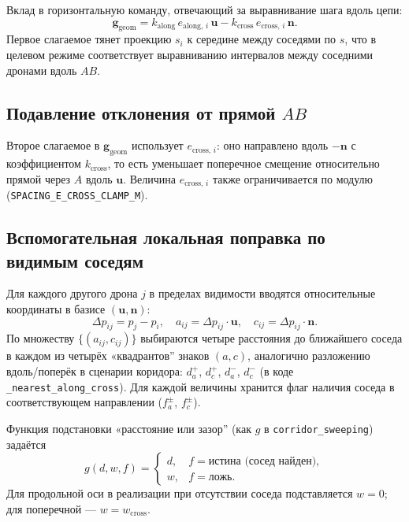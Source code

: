 \documentclass[12pt,a4paper]{article}
\begin{document}
Вклад в горизонтальную команду, отвечающий за выравнивание шага вдоль цепи:
\begin{equation}
  \mathbf{g}_{\mathrm{geom}} = k_{\mathrm{along}}\, e_{\mathrm{along},\,i}\, \mathbf{u} - k_{\mathrm{cross}}\, e_{\mathrm{cross},\,i}\, \mathbf{n}.
\end{equation}
Первое слагаемое тянет проекцию $s_i$ к середине между соседями по $s$, что в целевом режиме соответствует выравниванию интервалов между соседними дронами вдоль $AB$.

\subsection{Подавление отклонения от прямой $AB$}

Второе слагаемое в $\mathbf{g}_{\mathrm{geom}}$ использует $e_{\mathrm{cross},\,i}$: оно направлено вдоль $-\mathbf{n}$ с коэффициентом $k_{\mathrm{cross}}$, то есть уменьшает поперечное смещение относительно прямой через $A$ вдоль $\mathbf{u}$. Величина $e_{\mathrm{cross},\,i}$ также ограничивается по модулю (\texttt{SPACING\_E\_CROSS\_CLAMP\_M}).

\subsection{Вспомогательная локальная поправка по видимым соседям}

Для каждого другого дрона $j$ в пределах видимости вводятся относительные координаты в базисе $(\mathbf{u}, \mathbf{n})$:
\[
  \Delta p_{ij} = p_j - p_i, \quad
  a_{ij} = \Delta p_{ij} \cdot \mathbf{u}, \quad
  c_{ij} = \Delta p_{ij} \cdot \mathbf{n}.
\]
По множеству $\{(a_{ij}, c_{ij})\}$ выбираются четыре расстояния до ближайшего соседа в каждом из четырёх «квадрантов'' знаков $(a,c)$, аналогично разложению вдоль/поперёк в сценарии коридора: $d_a^+$, $d_c^+$, $d_a^-$, $d_c^-$ (в коде \texttt{\_nearest\_along\_cross}). Для каждой величины хранится флаг наличия соседа в соответствующем направлении ($f_a^\pm$, $f_c^\pm$).

Функция подстановки «расстояние или зазор'' (как $g$ в \texttt{corridor\_sweeping}) задаётся
\begin{equation}
  g(d, w, f) =
  \begin{cases}
    d, & f = \text{истина (сосед найден)}, \\
    w, & f = \text{ложь}.
  \end{cases}
\end{equation}
Для продольной оси в реализации при отсутствии соседа подставляется $w = 0$; для поперечной --- $w = w_{\mathrm{cross}}$.
\end{document}
